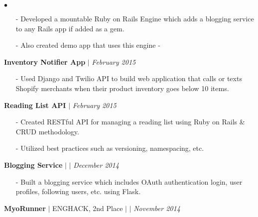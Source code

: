 \documentclass[10pt]{article}
\newenvironment{achievements}{\begin{list}{$\bullet$}{\topsep 0pt \itemsep -1.5pt \leftmargin 5pt}}{\vspace*{4pt}\end{list}}
\begin{document}
\begin{achievements}
\begin{itemize}
\item[-] Developed a mountable Ruby on Rails Engine which adds a blogging service to any Rails app if added as a gem.
\vspace{2pt}
\item[-] Also created demo app that uses this engine - \href{https://github.com/nakulpathak3/app-to-use-blorgh-gem}{\faGithub}
\end{itemize}
\vspace{2pt}
\item \textbf{Inventory Notifier App} $|$  \href{https://github.com/nakulpathak3/twilio-shopify-notifier}{\faGithub} \hfill \textit {February 2015}
\begin{itemize}
\item[-]Used Django and Twilio API to build web application that calls or texts Shopify merchants when their product inventory goes below 10 items.
\end{itemize}
\vspace{2pt}
\item \textbf{Reading List API} $|$  \href{https://github.com/nakulpathak3/books-api-rails}{\faGithub}  \hfill \textit {February 2015}
\begin{itemize}
\item[-]Created RESTful API for managing a reading list using Ruby on Rails \& CRUD methodology.
\vspace{2pt}
\item[-]Utilized best practices such as versioning, namespacing, etc.
\end{itemize}
\vspace{2pt}
\item \textbf{Blogging Service} $|$  \href{https://github.com/nakulpathak3/complete-microblog-flask}{\faGithub}  $|$ \href{http://nakul-microblog.herokuapp.com/}{\faExternalLink}  \hfill \textit {December 2014}
\begin{itemize}
\item[-]Built a blogging service which includes OAuth authentication login, user profiles, following users, etc. using Flask.
\end{itemize}
\vspace{2pt}
\item\textbf{MyoRunner} {$|$ \scriptsize ENGHACK, 2nd Place }  $|$  \href{https://github.com/nakulpathak3/myorunner}{\faGithub} $|$ \href{http://jhudson.ca/myorunaway}{\faExternalLink}\hfill \textit {November 2014}
\begin{itemize}

\end{itemize}
\end{achievements}
\end{document}
